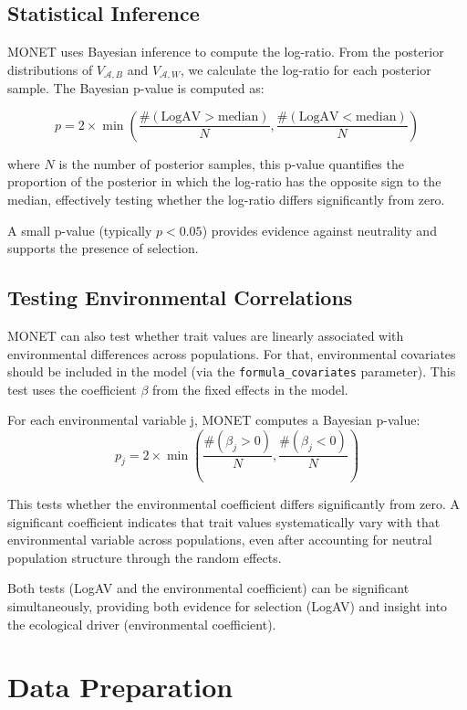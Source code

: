 \documentclass[11pt]{article}
\begin{document}
\subsection{Statistical Inference}

MONET uses Bayesian inference to compute the log-ratio. From the posterior distributions of $V_{ \mathcal{A},B}$ and $V_{ \mathcal{A},W}$, we calculate the log-ratio for each posterior sample. The Bayesian p-value is computed as:

$$p = 2 \times \min \left( \frac{\#(\text{LogAV} > \text{median})}{N}, \frac{\#(\text{LogAV} < \text{median})}{N} \right)$$

where $N$ is the number of posterior samples, this p-value quantifies the proportion of the posterior in which the log-ratio has the opposite sign to the median, effectively testing whether the log-ratio differs significantly from zero.

A small p-value (typically $p < 0.05$) provides evidence against neutrality and supports the presence of selection.

\subsection{Testing Environmental Correlations}
MONET can also test whether trait values are linearly associated with environmental differences across populations. For that, environmental covariates should be included in the model (via the  \lstinline{formula_covariates} parameter). This test uses the coefficient $\beta$ from the fixed effects in the model.

For each environmental variable j, MONET computes a Bayesian p-value:
\begin{equation}
    p_j = 2 \times \min\left(\frac{\#(\beta_j > 0)}{N}, \frac{\#(\beta_j < 0)}{N}\right)
\label{eq:pval_beta}
\end{equation}

This tests whether the environmental coefficient differs significantly from zero. A significant coefficient indicates that trait values systematically vary with that environmental variable across populations, even after accounting for neutral population structure through the random effects.

Both tests (LogAV and the environmental coefficient) can be significant simultaneously, providing both evidence for selection (LogAV) and insight into the ecological driver (environmental coefficient).

\section{Data Preparation}
\end{document}

